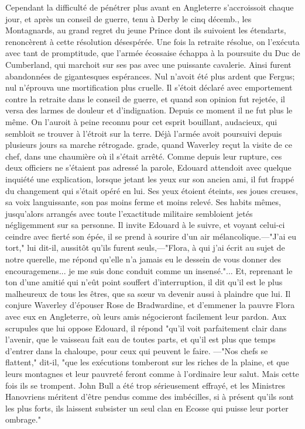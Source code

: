 Cependant la difficulté de pénétrer plus avant en Angleterre s'accroissoit chaque jour, et après un conseil de guerre, tenu à Derby le cinq décemb., les Montagnards, au grand regret du jeune Prince dont ils suivoient les étendarts, renoncèrent à cette résolution désespérée. Une fois la retraite résolue, on l'exécuta avec tant de promptitude, que l'armée écossaise échappa à la poursuite du Duc de Cumberland, qui marchoit sur ses pas avec une puissante cavalerie.
Ainsi furent abandonnées de gigantesques espérances. Nul n'avoit été plus ardent que Fergus; nul n'éprouva une mortification plus cruelle. Il s'étoit déclaré avec emportement contre la retraite dans le conseil de guerre, et quand son opinion fut rejetée, il versa des larmes de douleur et d'indignation. Depuis ce moment il ne fut plus le même. On l'auroit à peine reconnu pour cet esprit bouillant, audacieux, qui sembloit se trouver à l'étroit sur la terre. Déjà l'armée avoit poursuivi depuis plusieurs jours sa marche rétrogade.\setcounter{page}{365} grade, quand Waverley reçut la visite de ce chef, dans une chaumière où il s’était arrêté.
Comme depuis leur rupture, ces deux officiers ne s’étaient pas adressé la parole, Edouard attendoit avec quelque inquiété une explication, lorsque jetant les yeux sur son ancien ami, il fut frappé du changement qui s’était opéré en lui. Ses yeux étoient éteints, ses joues creuses, sa voix languissante, son pas moins ferme et moins relevé. Ses habits mêmes, jusqu’alors arrangés avec toute l’exactitude militaire sembloient jetés négligemment sur sa personne. Il invite Edouard à le suivre, et voyant celui-ci ceindre avec fierté son épée, il se prend à sourire d’un air mélancolique.—"J’ai eu tort," lui dit-il, aussitôt qu’ils furent seuls,—"Flora, à qui j’ai écrit au sujet de notre querelle, me répond qu’elle n’a jamais eu le dessein de vous donner des encouragemens... je me suis donc conduit comme un insensé."... Et, reprenant le ton d’une amitié qui n’eût point souffert d’interruption, il dit qu’il est le plus malheureux de tous les êtres, que sa sœur va devenir aussi à plaindre que lui. Il conjure Waverley d’épouser Rose de Bradwardine, et d’emmener la pauvre Flora avec eux en Angleterre, où leurs amis négocieront facilement leur pardon. Aux scrupules que lui oppose Edouard, il répond\setcounter{page}{366} "qu'il voit parfaitement clair dans l'avenir, que le vaisseau fait eau de toutes parts, et qu'il est plus que temps d'entrer dans la chaloupe, pour ceux qui peuvent le faire. —"Nos chefs se flattent," dit-il, "que les exécutions tomberont sur les riches de la plaine, et que leurs montagnes et leur pauvreté feront comme à l'ordinaire leur salut. Mais cette fois ils se trompent. John Bull a été trop sérieusement effrayé, et les Ministres Hanovriens méritent d'être pendus comme des imbécilles, si à présent qu'ils sont les plus forts, ils laissent subsister un seul clan en Ecosse qui puisse leur porter ombrage."
